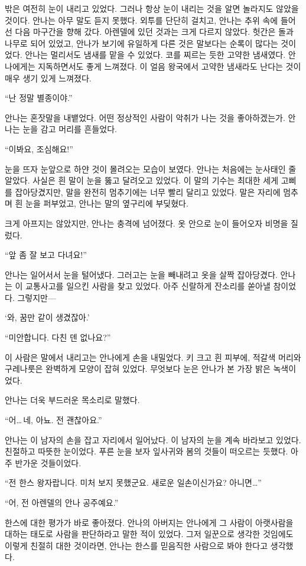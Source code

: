 밖은 여전히 눈이 내리고 있었다. 그러나 항상 눈이 내리는 것을 알면 놀라지도 않았을 것이다. 안나는 아무 말도 듣지 못했다. 외투를 단단히 걸치고, 안나는 추위 속에 들어선 다음 마구간을 향해 갔다. 아렌델에 있던 것과는 크게 다르지 않았다. 헛간은 돌과 나무로 되어 있었고, 안나가 보기에 유일하게 다른 것은 말보다는 순록이 많다는 것이었다. 안나는 멀리서도 냄새를 맡을 수 있었다. 코를 찌르는 듯한 고약한 냄새였다. 안나에게는 지독하면서도 좋게 느껴졌다. 이 얼음 왕국에서 고약한 냄새라도 난다는 것이 매우 생기 있게 느껴졌다.

``난 정말 별종이야.''

안나는 혼잣말을 내뱉었다. 어떤 정상적인 사람이 악취가 나는 것을 좋아하겠는가. 안나는 눈을 감고 머리를 흔들었다.

``이봐요, 조심해요!''

눈을 뜨자 눈앞으로 하얀 것이 몰려오는 모습이 보였다. 안나는 처음에는 눈사태인 줄 알았다. 사실은 흰 말이 눈을 뚫고 달려오고 있었다. 이 말의 기수는 최대한 세게 고삐를 잡아당겼지만, 말을 완전히 멈추기에는 너무 빨리 달리고 있었다. 말은 자리에 멈추며 흰 눈을 퍼부었고, 안나는 말의 옆구리에 부딪혔다.

크게 아프지는 않았지만, 안나는 충격에 넘어졌다. 옷 안으로 눈이 들어오자 비명을 질렀다.

``앞 좀 잘 보고 다녀요!''

안나는 일어서서 눈을 털어냈다. 그러고는 눈을 빼내려고 옷을 살짝 잡아당겼다. 안나는 이 교통사고를 일으킨 사람을 찾고 있었다. 아주 신랄하게 잔소리를 쏟아낼 참이었다. 그렇지만—

`와, 꿈만 같이 생겼잖아.'

``미안합니다. 다친 덴 없나요?''

이 사람은 말에서 내리고는 안나에게 손을 내밀었다. 키 크고 흰 피부에, 적갈색 머리와 구레나룻은 완벽하게 모양이 잡혀 있었다. 무엇보다 눈은 안나가 본 가장 밝은 녹색이었다.

안나는 더욱 부드러운 목소리로 말했다.

``어\ldots\,네, 아뇨. 전 괜찮아요.''

안나는 이 남자의 손을 잡고 자리에서 일어났다. 이 남자의 눈을 계속 바라보고 있었다. 친절하고 따뜻한 눈이었다. 푸른 눈을 보자 잎사귀와 봄의 것들이 떠오르는 듯했다. 아주 반가운 것들이었다.

``전 한스 왕자랍니다. 미처 보지 못했군요. 새로운 일손이신가요? 아니면\ldots''

``어, 전 아렌델의 안나 공주예요.''

한스에 대한 평가가 바로 좋아졌다. 안나의 아버지는 안나에게 그 사람이 아랫사람을 대하는 태도로 사람을 판단하라고 말한 적이 있었다. 그저 일꾼으로 생각한 것임에도 이렇게 친절히 대한 것이라면, 안나는 한스를 믿음직한 사람으로 봐야 한다고 생각했다.

